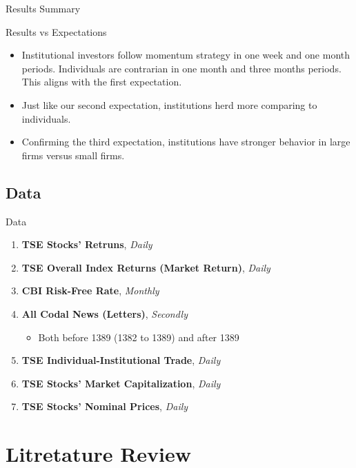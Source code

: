 \documentclass{beamer}
\begin{document}
\begin{frame}{Results Summary}
    \begin{block}{Results vs Expectations}
        \begin{itemize}
            \item Institutional investors follow momentum strategy in one week and one month periods. Individuals are contrarian in one month and three months periods. This aligns with the first expectation.
            \item Just like our second expectation, institutions herd more comparing to individuals.
            \item Confirming the third expectation, institutions have stronger behavior in large firms versus small firms.
        \end{itemize}
    \end{block}
\end{frame}


\subsection{Data}


\begin{frame}{Data}
    \begin{enumerate}
        \item \textbf{TSE Stocks' Retruns}, \textit{Daily}
        \item \textbf{TSE Overall Index Returns (Market Return)}, \textit{Daily}
        \item \textbf{CBI Risk-Free Rate}, \textit{Monthly}
        \item \textbf{All Codal News (Letters)}, \textit{Secondly}
              \begin{itemize}
                  \item Both before 1389 (1382 to 1389) and after 1389
              \end{itemize}
        \item \textbf{TSE Individual-Institutional Trade}, \textit{Daily}
        \item \textbf{TSE Stocks' Market Capitalization}, \textit{Daily}
        \item \textbf{TSE Stocks' Nominal Prices}, \textit{Daily}
    \end{enumerate}
\end{frame}


\section{Litretature Review}
\end{document}
